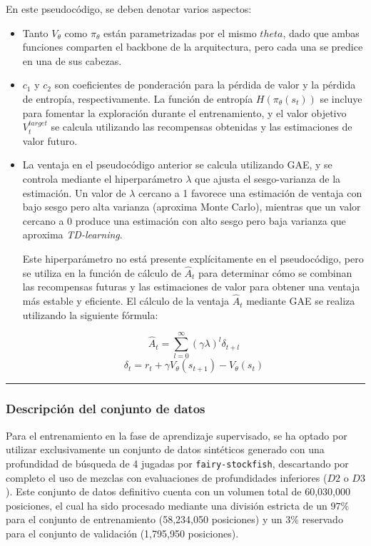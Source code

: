 \documentclass[12pt, a4paper]{article}
\begin{document}
En este pseudocódigo, se deben denotar varios aspectos:
\begin{itemize}
    \item Tanto $V_\theta$ como $\pi_{\theta}$ están parametrizadas por el mismo $theta$, dado que ambas funciones comparten el backbone de la arquitectura, pero cada una se predice en una de sus cabezas. 
    \item $c_1$ y $c_2$ son coeficientes de ponderación para la pérdida de valor y la pérdida de entropía, respectivamente. La función de entropía $H(\pi_\theta(s_t))$ se incluye para fomentar la exploración durante el entrenamiento, y el valor objetivo $V_t^{target}$ se calcula utilizando las recompensas obtenidas y las estimaciones de valor futuro.
    
    
    \item La ventaja en el pseudocódigo anterior se calcula utilizando GAE, y se controla mediante el hiperparámetro $\lambda$ que ajusta el sesgo-varianza de la estimación. 
    Un valor de $\lambda$ cercano a 1 favorece una estimación de ventaja con bajo sesgo pero alta varianza (aproxima Monte Carlo), mientras que un valor cercano a 0 produce una estimación con alto sesgo pero baja varianza que aproxima \textit{TD-learning}.

    Este hiperparámetro no está presente explícitamente en el pseudocódigo, pero se utiliza en la función de cálculo de $\hat{A}_t$ para determinar cómo se combinan las recompensas futuras y las estimaciones de valor para obtener una ventaja más estable y eficiente.
    El cálculo de la ventaja $\hat{A}_t$ mediante GAE se realiza utilizando la siguiente fórmula:

    $$\hat{A}_t = \sum_{l=0}^{\infty} (\gamma \lambda)^l \delta_{t+l}$$
    $$\delta_t = r_t + \gamma V_\theta(s_{t+1}) - V_\theta(s_t)$$
    
\end{itemize}

\rule{\textwidth}{0.2pt}
\subsubsection{Descripción del conjunto de datos}

Para el entrenamiento en la fase de aprendizaje supervisado, se ha optado por utilizar exclusivamente un conjunto de datos sintéticos generado con una profundidad de búsqueda de 4 jugadas por \texttt{fairy-stockfish}, descartando por completo el uso de mezclas con evaluaciones de profundidades inferiores ($D2$ o $D3$). Este conjunto de datos definitivo cuenta con un volumen total de 60,030,000 posiciones, el cual ha sido procesado mediante una división estricta de un $97\%$ para el conjunto de entrenamiento (58,234,050 posiciones) y un $3\%$ reservado para el conjunto de validación (1,795,950 posiciones).
\end{document}
